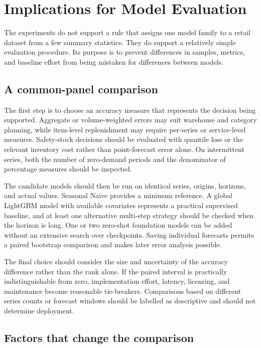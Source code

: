 \section{Implications for Model Evaluation}
\label{sec:framework}

The experiments do not support a rule that assigns one model family to a
retail dataset from a few summary statistics. They do support a relatively
simple evaluation procedure. Its purpose is to prevent differences in samples,
metrics, and baseline effort from being mistaken for differences between
models.

\subsection{A common-panel comparison}
\label{subsec:validation-checklist}

The first step is to choose an accuracy measure that represents the decision
being supported. Aggregate or volume-weighted errors may suit warehouse and
category planning, while item-level replenishment may require per-series or
service-level measures. Safety-stock decisions should be evaluated with
quantile loss or the relevant inventory cost rather than point-forecast error
alone. On intermittent series, both the number of zero-demand periods and the
denominator of percentage measures should be inspected.

The candidate models should then be run on identical series, origins,
horizons, and actual values. Seasonal Naive provides a minimum reference. A
global LightGBM model with available covariates represents a practical
supervised baseline, and at least one alternative multi-step strategy should
be checked when the horizon is long. One or two zero-shot foundation models
can be added without an extensive search over checkpoints. Saving individual
forecasts permits a paired bootstrap comparison and makes later error analysis
possible.

The final choice should consider the size and uncertainty of the accuracy
difference rather than the rank alone. If the paired interval is practically
indistinguishable from zero, implementation effort, latency, licensing, and
maintenance become reasonable tie-breakers. Comparisons based on different
series counts or forecast windows should be labelled as descriptive and should
not determine deployment.

\subsection{Factors that change the comparison}
\label{subsec:framework-moderators}


